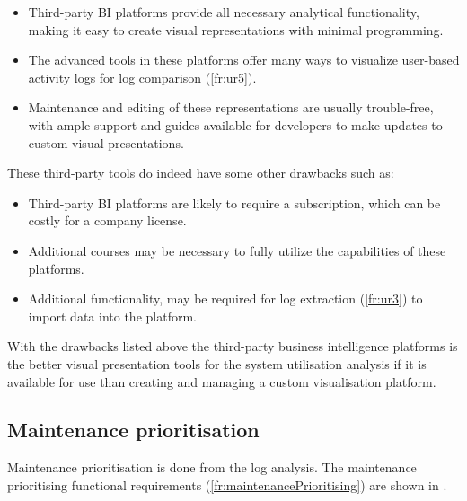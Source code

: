 \begin{itemize}
	\item \RaggedRight Third-party BI platforms provide all necessary analytical functionality, making it easy to create visual representations with minimal programming.
	\item \RaggedRight The advanced tools in these platforms offer many ways to visualize user-based activity logs for log comparison (\ref{fr:ur5}).
	\item \RaggedRight Maintenance and editing of these representations are usually trouble-free, with ample support and guides available for developers to make updates to custom visual presentations.
	\end{itemize}

These third-party tools do indeed have some other drawbacks such as:

\begin{itemize}
	\item \RaggedRight Third-party BI platforms are likely to require a subscription, which can be costly for a company license.
	\item \RaggedRight Additional courses may be necessary to fully utilize the capabilities of these platforms.
	\item \RaggedRight Additional functionality, may be required for log extraction (\ref{fr:ur3}) to import data into the platform.
	\end{itemize}

With the drawbacks listed above the third-party business intelligence platforms is the better visual presentation tools for the system utilisation analysis if it is available for use than creating and managing a custom visualisation platform.

\subsection{Maintenance prioritisation}\label{sec:ch2_utilisationImprovements}
Maintenance prioritisation is done from the log analysis. The maintenance prioritising functional requirements (\ref{fr:maintenancePrioritising}) are shown in .

